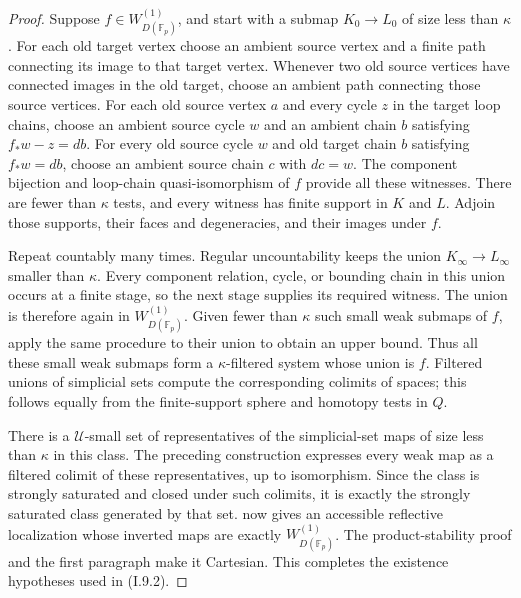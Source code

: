 \begin{proof}
Suppose $f\in W_{D(\mathbb F_p)}^{(1)}$, and start with a submap $K_0\to L_0$ of size less than $\kappa$. For each old target vertex choose an ambient source vertex and a finite path connecting its image to that target vertex. Whenever two old source vertices have connected images in the old target, choose an ambient path connecting those source vertices. For each old source vertex $a$ and every cycle $z$ in the target loop chains, choose an ambient source cycle $w$ and an ambient chain $b$ satisfying $f_*w-z=db$. For every old source cycle $w$ and old target chain $b$ satisfying $f_*w=db$, choose an ambient source chain $c$ with $dc=w$. The component bijection and loop-chain quasi-isomorphism of $f$ provide all these witnesses. There are fewer than $\kappa$ tests, and every witness has finite support in $K$ and $L$. Adjoin those supports, their faces and degeneracies, and their images under $f$.

Repeat countably many times. Regular uncountability keeps the union $K_\infty\to L_\infty$ smaller than $\kappa$. Every component relation, cycle, or bounding chain in this union occurs at a finite stage, so the next stage supplies its required witness. The union is therefore again in $W_{D(\mathbb F_p)}^{(1)}$. Given fewer than $\kappa$ such small weak submaps of $f$, apply the same procedure to their union to obtain an upper bound. Thus all these small weak submaps form a $\kappa$-filtered system whose union is $f$. Filtered unions of simplicial sets compute the corresponding colimits of spaces; this follows equally from the finite-support sphere and homotopy tests in $Q$.

There is a $\mathcal U$-small set of representatives of the simplicial-set maps of size less than $\kappa$ in this class. The preceding construction expresses every weak map as a filtered colimit of these representatives, up to isomorphism. Since the class is strongly saturated and closed under such colimits, it is exactly the strongly saturated class generated by that set. \citet[Proposition~5.5.4.15]{GHIJLurie2009} now gives an accessible reflective localization whose inverted maps are exactly $W_{D(\mathbb F_p)}^{(1)}$. The product-stability proof and the first paragraph make it Cartesian. This completes the existence hypotheses used in (I.9.2).


\end{proof}
